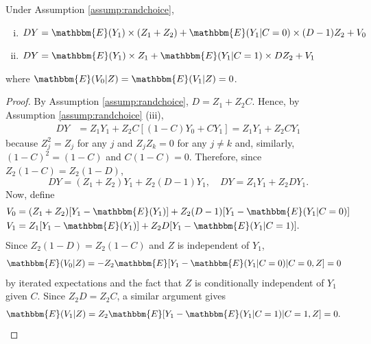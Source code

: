 \begin{appendix}
\begin{prop}
\label{prop:ASLreg}
Under Assumption \ref{assump:randchoice},
\begin{enumerate}[(i)]
\item $D Y = \mathbbm{E}(Y_{1}) \times(Z_1 + Z_2) + \mathbbm{E}(Y_{1}|C=0)\times (D - 1)Z_2 + V_{0}$
\item  $D Y = \mathbbm{E}(Y_{1}) \times Z_1 + \mathbbm{E}(Y_{1}|C=1)\times D Z_2+ V_{1}$
\end{enumerate}
where $\mathbbm{E}(V_0|Z) = \mathbbm{E}(V_1|Z) = 0$.
\end{prop}


\begin{proof}
By Assumption \ref{assump:randchoice}, $D = Z_1 + Z_2 C$. Hence, by Assumption \ref{assump:randchoice} (iii),
\begin{align*}
DY 
&= Z_1 Y_1 + Z_2 C[(1 -C) Y_0 + C Y_1] = Z_1 Y_1 + Z_2 C Y_1
\end{align*}
because $Z_j^2 = Z_j$ for any $j$ and $Z_j Z_k = 0$ for any $j \neq k$ and, similarly, $(1 - C)^2 = (1 - C)$ and $C (1 - C) = 0$. Therefore, since $Z_2 (1 - C) = Z_2 (1 - D)$,
\[
 DY = (Z_1 + Z_2)Y_1 + Z_2 (D - 1) Y_1, \quad
 DY = Z_1 Y_1 + Z_2 D Y_1.
\]
Now, define
\begin{align*}
V_0 &= (Z_1 + Z_2)[Y_1 - \mathbbm{E}(Y_1)] + Z_2(D - 1)[Y_1 - \mathbbm{E}(Y_1|C=0)]\\
V_1 &= Z_1[Y_1 - \mathbbm{E}(Y_1)] + Z_2D[Y_1 - \mathbbm{E}(Y_1|C=1)].
\end{align*}
Since $Z_2(1 - D) = Z_2(1 - C)$ and $Z$ is independent of $Y_1$,
\begin{align*}
\mathbbm{E}(V_0|Z) 
&= -Z_2 \mathbbm{E}[Y_1 - \mathbbm{E}(Y_1 | C=0)|C=0, Z] = 0
\end{align*}
by iterated expectations and the fact that  $Z$ is conditionally independent of $Y_1$ given $C$. 
Since $Z_2 D = Z_2 C$, a similar argument gives
\begin{align*}
\mathbbm{E}(V_1|Z) 
&= Z_2 \mathbbm{E}[Y_1 - \mathbbm{E}(Y_1 | C=1)|C=1, Z] = 0. \qedhere
\end{align*}
\end{proof}


\end{appendix}
